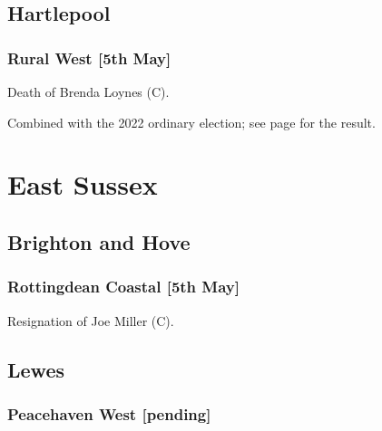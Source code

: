 \documentclass[a4paper,openany]{book}
\begin{document}
\begin{resultsiii}
\subsection*{Hartlepool}

\subsubsection*{Rural West \hspace*{\fill}\nolinebreak[1]%
	\enspace\hspace*{\fill}
	[5th May]}


Death of Brenda Loynes (C).

Combined with the 2022 ordinary election; see page \pageref{HartlepoolRuralWest} for the result.

\section{East Sussex}

\subsection*{Brighton and Hove}

\subsubsection*{Rottingdean Coastal \hspace*{\fill}\nolinebreak[1]%
	\enspace\hspace*{\fill}
	[5th May]}


Resignation of Joe Miller (C).

\subsection*{Lewes}

\subsubsection*{Peacehaven West \hspace*{\fill}\nolinebreak[1]%
	\enspace\hspace*{\fill}
	[pending]}


\end{resultsiii}
\end{document}
